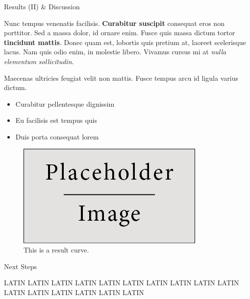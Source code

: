 \documentclass[final]{beamer}
\newlength{\onecolwid}
\begin{document}
\begin{frame}[t]
\begin{columns}[t]
\begin{column}{\onecolwid}
\begin{block}{Results (II) \& Discussion}

Nunc tempus venenatis facilisis. \textbf{Curabitur suscipit} consequat eros non porttitor. Sed a massa dolor, id ornare enim. Fusce quis massa dictum tortor \textbf{tincidunt mattis}. Donec quam est, lobortis quis pretium at, laoreet scelerisque lacus. Nam quis odio enim, in molestie libero. Vivamus cursus mi at \textit{nulla elementum sollicitudin}.

Maecenas ultricies feugiat velit non mattis. Fusce tempus arcu id ligula varius dictum. 
\begin{itemize}
\item Curabitur pellentesque dignissim
\item Eu facilisis est tempus quis
\item Duis porta consequat lorem
\end{itemize}

\begin{figure}
\includegraphics[width=\linewidth]{placeholder.jpg}
\caption{This is a result curve.}
\end{figure}

\end{block}

\vspace{-1in.}
\begin{block}{Next Steps}

LATIN LATIN LATIN LATIN
LATIN LATIN LATIN LATIN
LATIN LATIN LATIN LATIN
LATIN LATIN LATIN LATIN

\end{block}




\end{column}
\end{columns}
\end{frame}
\end{document}

